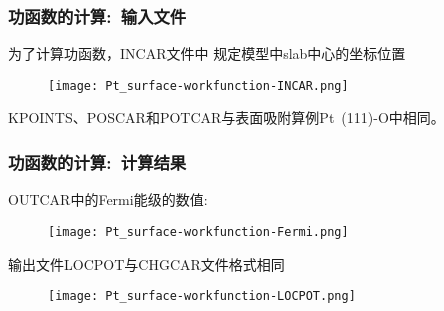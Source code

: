 \frame
{
	\frametitle{功函数的计算:~输入文件}
为了计算功函数，\textrm{INCAR}文件中%
规定模型中\textrm{slab}中心的坐标位置%
\begin{figure}[h!]
\centering
\texttt{[image: Pt\_surface-workfunction-INCAR.png]}
\caption{\fontsize{6.2pt}{5.2pt}}%
\label{Pt_surface-workfunction-INCAR}
\end{figure}

\textrm{KPOINTS}、\textrm{POSCAR}和\textrm{POTCAR}与表面吸附算例\textrm{Pt~(111)-O}中相同。
}
\frame
{
\frametitle{\rm{功函数的计算:~计算结果}}
\textrm{OUTCAR}中的\textrm{Fermi}能级的数值:
\begin{figure}[h!]
\centering
\vskip -3pt
\texttt{[image: Pt\_surface-workfunction-Fermi.png]}
\caption{\fontsize{6.2pt}{5.2pt}}%
\label{Pt_surface-workfunction-LOCPOT}
\end{figure}
输出文件\textrm{LOCPOT}与\textrm{CHGCAR}文件格式相同\\
{\fontsize{6.2pt}{5.2pt}}
\begin{figure}[h!]
	\vskip -5pt
\centering
\texttt{[image: Pt\_surface-workfunction-LOCPOT.png]}
\caption{\fontsize{6.2pt}{5.2pt}}%
\label{Pt_surface-workfunction-LOCPOT}
\end{figure}
}

